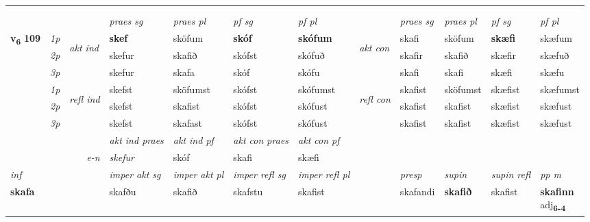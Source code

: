 \begin{longtable}[l]{X>{\footnotesize\itshape}llXXXXlXXXX}
\midrule
   & \\*
  & \\
   \midrule
 & &   & \textit{praes sg}  & \textit{praes pl}    & \textit{ pf sg} & \textit{pf pl} & & \textit{praes sg}  & \textit{praes pl}    & \textit{pf sg} & \textit{pf pl }  \\ \cmidrule{4-7} \cmidrule{9-12}
 \multirow{2}{*}{{{\textbf{v{\textsubscript{6}}} \Large{\textbf{109}}}}}  & 1p & \multirow{3}{*}{\begin{turn}{90}\textit{akt ind}\end{turn}} & \textbf{skef} & sköfum & \textbf{skóf} & \textbf{skófum} & \multirow{3}{*}{\begin{turn}{90}\textit{akt con}\end{turn}} &skafi & sköfum & \textbf{skæfi} & skæfum\\*
 & 2p &  &  skefur  & skafið & skófst & skófuð & & skafir & skafið & skæfir & skæfuð \\*
 & 3p &  & skefur & skafa & skóf & skófu & & skafi & skafi& skæfi & skæfu \\*
\cmidrule{4-7} \cmidrule{9-12}
 & 1p & \multirow{3}{*}{\begin{turn}{90}\textit{refl ind}\end{turn}}  & skefst & sköfumst & skófst & skófumst & \multirow{3}{*}{\begin{turn}{90}\textit{refl con}\end{turn}}  &skafist & sköfumst & skæfist & skæfumst \\*
 & 2p &  & skefst & skafist & skófst & skófust & &skafist & skafist & skæfist & skæfust \\*
 & 3p  & & skefst & skafast & skófst & skófust & & skafist & skafist& skæfist & skæfust \\*
\cmidrule{4-7} \cmidrule{9-12}

   && &  \textit{akt ind praes} & \textit{akt ind pf} & \textit{akt con praes} & \textit{akt con pf} \\*
\multicolumn{3}{r}{\textit{e-n}} & skefur & skóf & skafi & skæfi \\*

\cmidrule{4-7}
   {\textit{inf}} & &  & \textit{imper akt sg} & \textit{imper akt pl} & \textit{imper refl sg} & \textit{imper refl pl} && \textit{presp} & \textit{supin} & \textit{supin refl} & \textit{pp m} \\*
  {\textbf{skafa}} & && skafðu  & skafið & skafstu & skafist && skafandi &  \textbf{skafið} & skafist & \specialcell{\textbf{skafinn} \\ adj\textbf{\textsubscript{6-4}}} \\*


\end{longtable}
